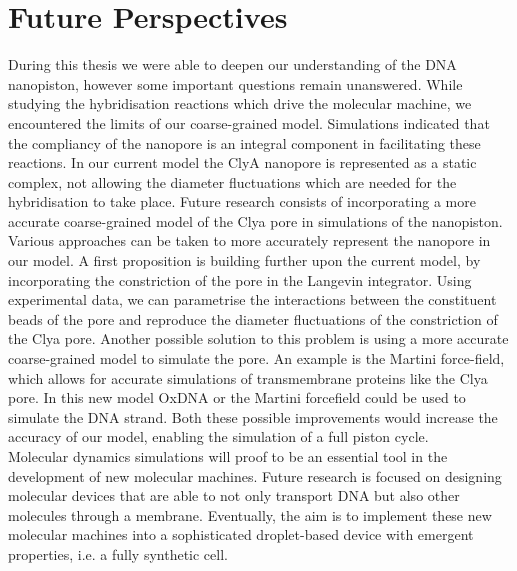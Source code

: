 \section{Future Perspectives}

During this thesis we were able to deepen our understanding of the DNA
nanopiston, however some important questions remain unanswered. While studying the
hybridisation reactions which drive the molecular machine, we encountered the limits of
our coarse-grained model. Simulations indicated that the compliancy of the nanopore
is an integral component in facilitating these reactions. In our current model the ClyA
nanopore is represented as a static complex, not allowing the diameter fluctuations which
are needed for the hybridisation to take place.
Future research consists of incorporating a more accurate coarse-grained model of the
Clya pore in simulations of the nanopiston.\\

Various approaches can be taken to more accurately represent the nanopore in our model.
A first proposition is building further upon the current model, by incorporating the
constriction of the pore in the Langevin integrator. Using experimental data, we can
parametrise the interactions between the constituent beads of the pore and reproduce the
diameter fluctuations of the constriction of the Clya pore. Another possible
solution to this problem is using a more accurate coarse-grained model to simulate the
pore. An example is the Martini force-field, which allows for accurate simulations of
transmembrane proteins like the Clya pore. In this new model OxDNA or the Martini
forcefield could be used to simulate the DNA strand. Both these possible improvements
would increase the accuracy of our model, enabling the simulation of a full piston
cycle.\\

Molecular dynamics simulations will proof to be an essential tool in the development of
new molecular machines. Future research is focused on designing molecular devices that
are able to not only transport DNA but also other molecules through a membrane.
Eventually, the aim is to implement these new molecular machines into a sophisticated
droplet-based device with emergent properties, i.e. a fully synthetic cell.

